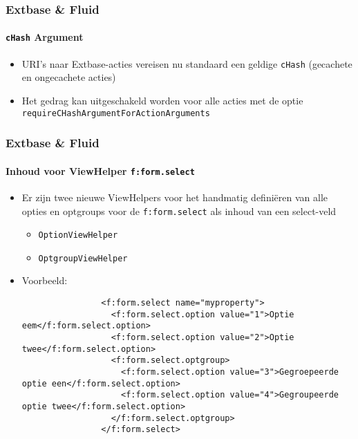 \begin{frame}[fragile]
	\frametitle{Extbase \& Fluid}
	\framesubtitle{\texttt{cHash} Argument}

	\begin{itemize}
		\item URI's naar Extbase-acties vereisen nu standaard een geldige \texttt{cHash}\newline
			(gecachete en ongecachete acties)
		\item Het gedrag kan uitgeschakeld worden voor alle acties met de optie
			\texttt{requireCHashArgumentForActionArguments}
	\end{itemize}

\end{frame}

\begin{frame}[fragile]
	\frametitle{Extbase \& Fluid}
	\framesubtitle{Inhoud voor ViewHelper \texttt{f:form.select}}

	\lstset{basicstyle=\tiny\ttfamily}

	\begin{itemize}
		\item Er zijn twee nieuwe ViewHelpers voor het handmatig definiëren van alle opties en
		 	optgroups voor de \texttt{f:form.select} als inhoud van een select-veld

			\begin{itemize}
				\item \texttt{OptionViewHelper}
				\item \texttt{OptgroupViewHelper}
			\end{itemize}

		\item Voorbeeld:

			\begin{lstlisting}
				<f:form.select name="myproperty">
				  <f:form.select.option value="1">Optie eem</f:form.select.option>
				  <f:form.select.option value="2">Optie twee</f:form.select.option>
				  <f:form.select.optgroup>
				    <f:form.select.option value="3">Gegroepeerde optie een</f:form.select.option>
				    <f:form.select.option value="4">Gegroupeerde optie twee</f:form.select.option>
				  </f:form.select.optgroup>
				</f:form.select>
			\end{lstlisting}

		\end{itemize}

\end{frame}



